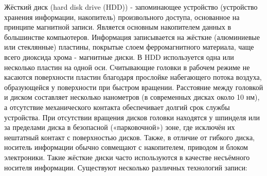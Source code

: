 Жёсткий диск (hard disk drive (HDD)) - запоминающее устройство (устройство хранения информации, накопитель) произвольного доступа, основанное на принципе магнитной записи. Является основным накопителем данных в большинстве компьютеров.
Информация записывается на жёсткие (алюминиевые или стеклянные) пластины, покрытые слоем ферромагнитного материала, чаще всего диоксида хрома - магнитные диски. В HDD используется одна или несколько пластин на одной оси. Считывающие головки в рабочем режиме не касаются поверхности пластин благодаря прослойке набегающего потока воздуха, образующейся у поверхности при быстром вращении. Расстояние между головкой и диском составляет несколько нанометров (в современных дисках около 10 нм), а отсутствие механического контакта обеспечивает долгий срок службы устройства. При отсутствии вращения дисков головки находятся у шпинделя или за пределами диска в безопасной («парковочной») зоне, где исключён их нештатный контакт с поверхностью дисков.
Также, в отличие от гибкого диска, носитель информации обычно совмещают с накопителем, приводом и блоком электроники. Такие жёсткие диски часто используются в качестве несъёмного носителя информации.
Существуют несколько различных технологий записи: 
